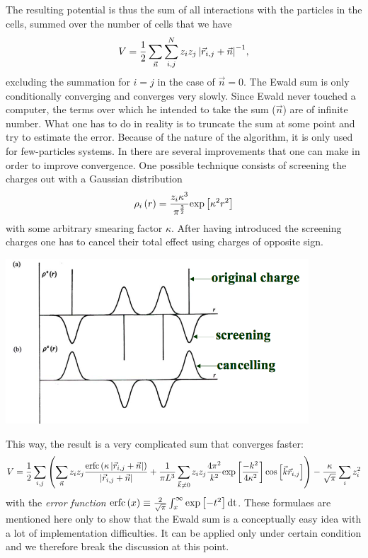 \noindent
The resulting potential is thus the sum of all interactions with the particles in the cells, summed over the number of cells that we have
\begin{equation}
V= \frac{1}{2} \sum _{\vec{n}} {     \sum_{i,j}^N {z_i z_j \left|\vec{r}_{i,j} + \vec{n}\right|^{-1}}    },
\label{eq:ewald}
\end{equation} 
excluding the summation for  $i=j$ in the case of $\vec{n} = 0$. The Ewald sum is only conditionally converging and converges very slowly. Since Ewald never touched a computer, the terms over which he intended to take the sum ($\vec{n}$) are of infinite number. What one has to do in reality is to truncate the sum at some point and try to estimate the error. Because of the nature of the algorithm, it is only used for few-particles systems. In \citet{dixon} there are several improvements that one can make in order to improve convergence. One possible technique consists of screening the charges out with a Gaussian distribution
$$
\rho_i\left(r\right) = \frac{z_i \kappa^3}{\pi^{\frac{3}{2}}} \text{exp}\left[\kappa^2r^2\right]
$$ 
with some arbitrary smearing factor $\kappa$.
After having introduced the screening charges one has to cancel their total effect using charges of opposite sign.

\vspace{0.1cm}
\noindent
\begin{minipage}{\textwidth}
\begin{minipage}{.98\textwidth}
  \centering
  \includegraphics[width=0.85\textwidth]{pics/ewald_screening}
  \label{fig:ewald_screening}
\end{minipage}
\end{minipage}
\vspace{0.1cm}

This way, the result is a very complicated sum that converges faster:
$$
V=\frac{1}{2} \sum_{i,j}   \left(   \sum_{\vec{n}} z_iz_j \frac {\text{erfc}\left(\kappa \left|\vec{r}_{i,j}+\vec{n}\right|\right)}{\left|\vec{r}_{i,j} + \vec{n}\right|}  +  \frac{1}{\pi L^3} \sum_{\vec{k}\ne 0} z_iz_j \frac{4\pi^2}{k^2} \text{exp}\left[\frac{-k^2}{4\kappa^2}\right] \text{cos}\left[\vec{k}\vec{r}_{i,j}\right]    \right) -\frac{\kappa}{\sqrt{\pi}} \sum_i z^2_i
$$ with the \emph{error function} $\text{erfc}\left(x\right) \equiv \frac{2}{\sqrt{\pi}} \int_x^\infty \text{exp}\left[-t^2\right]\text{dt}$. These formulaes are mentioned here only to show that the Ewald sum is a conceptually easy idea with a lot of implementation difficulties. It can be applied only under certain condition and we therefore break the discussion at this point.





